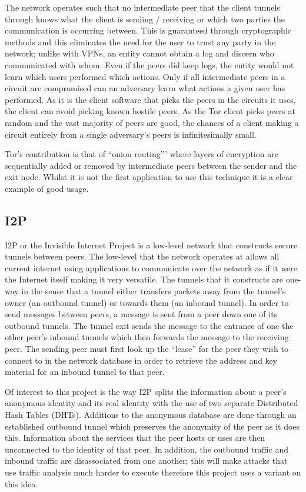 \documentclass[ %
                    author={Luke Murray},
                supervisor={Dr. Simon Hollis},
                     title={Shadow Peer-to-Peer Networks},
                  subtitle={},
                    degree={MEng},
                      year={2013} ]{thesis}
\begin{document}
The network operates such that no intermediate peer that the client tunnels through knows what the client is sending / receiving or which two parties the communication is occurring between. This is guaranteed through cryptographic methods and this eliminates the need for the user to trust any party in the network; unlike with VPNs, an entity cannot obtain a log and discern who communicated with whom. Even if the peers did keep logs, the entity would not learn which users performed which actions. Only if all intermediate peers in a circuit are compromised can an adversary learn what actions a given user has performed. As it is the client software that picks the peers in the circuits it uses, the client can avoid picking known hostile peers. As the Tor client picks peers at random and the vast majority of peers are good, the chances of a client making a circuit entirely from a single adversary's peers is infinitesimally small.

Tor's contribution is that of ``onion routing''' where layers of encryption are sequentially added or removed by intermediate peers between the sender and the exit node. Whilst it is not the first application to use this technique it is a clear example of good usage.

\subsection{I2P}

I2P\cite{I2P} or the Invisible Internet Project is a low-level network that constructs secure tunnels between peers. The low-level that the network operates at allows all current internet using applications to communicate over the network as if it were the Internet itself making it very versatile. The tunnels that it constructs are one-way in the sense that a tunnel either transfers packets away from the tunnel's owner (an outbound tunnel) or towards them (an inbound tunnel). In order to send messages between peers, a message is sent from a peer down one of its outbound tunnels. The tunnel exit sends the message to the entrance of one the other peer's inbound tunnels which then forwards the message to the receiving peer. The sending peer must first look up the ``lease'' for the peer they wish to connect to in the network database in order to retrieve the address and key material for an inbound tunnel to that peer.

Of interest to this project is the way I2P splits the information about a peer's anonymous identity and its real identity with the use of two separate Distributed Hash Tables (DHTs). Additions to the anonymous database are done through an established outbound tunnel which preserves the anonymity of the peer as it does this. Information about the services that the peer hosts or uses are then unconnected to the identity of that peer. In addition, the outbound traffic and inbound traffic are disassociated from one another; this will make attacks that use traffic analysis much harder to execute therefore this project uses a variant on this idea.
\end{document}
